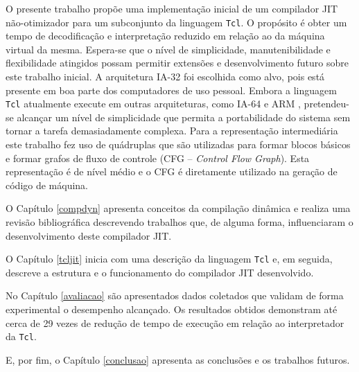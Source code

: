O presente trabalho propõe uma implementação inicial de um compilador
JIT não-otimizador para um subconjunto da linguagem \texttt{Tcl}. O
propósito é obter um tempo de decodificação e interpretação
reduzido em relação ao da máquina virtual da mesma. Espera-se que o nível de
simplicidade, manutenibilidade e flexibilidade atingidos possam
permitir extensões e desenvolvimento futuro sobre este trabalho inicial.
A arquitetura IA-32 \cite{intel_basicarch} foi escolhida como alvo, pois está presente em boa
parte dos computadores de uso pessoal. Embora a linguagem \texttt{Tcl}
atualmente execute em outras arquiteturas, como IA-64
\cite{intel_basicarch} e ARM \cite{arm_arch}, pretendeu-se alcançar um
nível de simplicidade que permita a portabilidade do sistema sem
tornar a tarefa demasiadamente complexa. Para a representação intermediária este trabalho fez uso de
quádruplas \cite{muchnick} que são utilizadas para formar
blocos básicos e
formar grafos de fluxo de controle (CFG -- \textit{Control Flow
  Graph}). Esta representação é de nível médio e
o CFG é diretamente utilizado na geração de código de máquina.

O Capítulo \ref{compdyn} apresenta conceitos da compilação dinâmica e
realiza uma revisão bibliográfica descrevendo trabalhos que, de alguma
forma, influenciaram o desenvolvimento deste compilador JIT.

O Capítulo \ref{tcljit} inicia com uma descrição da linguagem
\texttt{Tcl} e, em seguida, descreve a estrutura e o funcionamento do
compilador JIT desenvolvido.

No Capítulo \ref{avaliacao} são apresentados dados coletados que
validam de forma experimental o desempenho alcançado. Os resultados
obtidos demonstram até cerca de 29 vezes de redução de tempo de
execução em relação ao interpretador da \texttt{Tcl}.

E, por fim, o Capítulo \ref{conclusao} apresenta as conclusões e os
trabalhos futuros.


